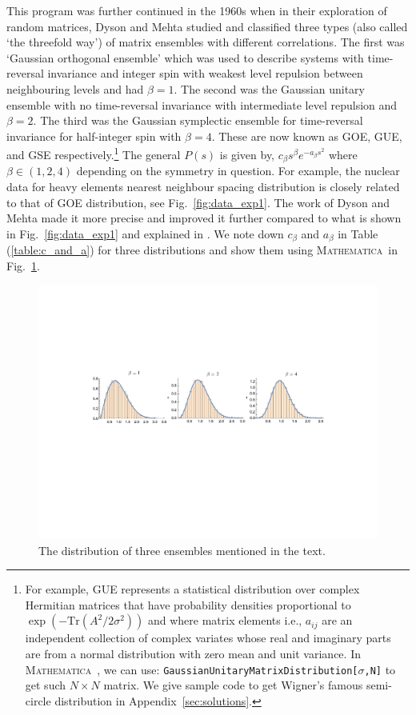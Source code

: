 \documentclass[letter,11pt]{article}
\newcommand{\MA}{\textsc{Mathematica}}
\begin{document}
This program was further continued in the 1960s when in their exploration of random matrices, Dyson and Mehta studied and classified three types (also called `the threefold way') of matrix ensembles with different correlations. The first was `Gaussian orthogonal ensemble' which was used to describe systems with time-reversal invariance and integer spin with weakest level repulsion between neighbouring levels and had $\beta=1$. The second was the Gaussian unitary ensemble with no time-reversal invariance with intermediate level repulsion and $\beta=2$. The third was the Gaussian symplectic ensemble for time-reversal invariance for 
half-integer spin with $\beta=4$. These are now known as GOE, GUE, and GSE respectively.\footnote{For example, GUE represents a statistical distribution over complex Hermitian matrices 
that have probability densities proportional to $ \exp(-\mbox{Tr}(A^2/2\sigma^2))$ and
where matrix elements i.e., $a_{ij}$ are an independent collection of complex 
variates whose real and imaginary parts are from a normal distribution
with zero mean and unit variance. In \MA~, we can use: 
\texttt{GaussianUnitaryMatrixDistribution[$\sigma$,N]}
to get such $N \times N$ matrix. We give sample code to get Wigner's famous semi-circle distribution in Appendix~\ref{sec:solutions}.} 
The general $P(s)$ is given by, $c_{\beta}s^{\beta} e^{-a_{\beta}s^2}$ 
where $\beta \in (1,2,4)$ depending on the symmetry in question. 
For example, the nuclear data for heavy elements nearest neighbour spacing distribution
is closely related to that of GOE distribution, see Fig.~\ref{fig:data_exp1}. 
The work of Dyson and Mehta made it more precise and improved it further 
compared to what is shown in Fig.~\ref{fig:data_exp1} and explained in 
\cite{PhysRevLett.48.1086}. We note down $c_{\beta}$ and $a_{\beta}$ in Table (\ref{table:c_and_a}) 
for three distributions and show them using \MA~in Fig.~\ref{fig:ensem1}.  

\begin{figure}[htbp] 
	\centering 
	\includegraphics[width=1.05\textwidth]{figs/ensem.pdf}
	\caption{\label{fig:ensem1}The distribution of three ensembles mentioned in the text.}
\end{figure}
\end{document}
